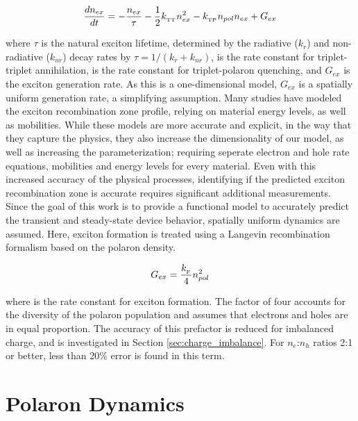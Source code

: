 \documentclass[../thesis.tex]{subfiles}
\begin{document}
\begin{equation}
\frac{dn_{ex}}{dt} = - \frac{n_{ex}}{\tau}-\frac{1}{2}k_{_\text{\tiny TT}} n_{ex}^2-k_{_\text{\tiny TP}} n_{pol}n_{ex}+G_{ex}
\label{eqn:exciton_rate}
\end{equation}

where $\tau$ is the natural exciton lifetime, determined by the radiative ($k_r$) and non-radiative ($k_{nr}$) decay rates by $\tau=1/(k_r+k_{nr})$, \ktt is the rate constant for triplet-triplet annihilation, \ktp is the rate constant for triplet-polaron quenching, and $G_{ex}$ is the exciton generation rate.  
As this is a one-dimensional model, $G_{ex}$ is a spatially uniform generation rate, a simplifying assumption.
Many studies have modeled the exciton recombination zone profile, relying on material energy levels, as well as mobilities.\cite{Rihani2006,Hassine2001,Hassine2002,Ruhstaller2003,Ruhstaller2001}
While these models are more accurate and explicit, in the way that they capture the physics, they also increase the dimensionality of our model, as well as increasing the parameterization; requiring seperate electron and hole rate equations, mobilities and energy levels for every material.
Even with this increased accuracy of the physical processes, identifying if the predicted exciton recombination zone is accurate requires significant additional measurements.
Since the goal of this work is to provide a functional model to accurately predict the transient and steady-state device behavior, spatially uniform dynamics are assumed.
Here, exciton formation is treated using a Langevin recombination formalism based on the polaron density.\cite{Ruhstaller2003,Pinner1999,Blom1996}

\begin{equation}
G_{ex}=\frac{k_{_\text{\tiny F}}}{4}n_{pol}^2
\label{eqn:exciton_formation}
\end{equation}

where \kf is the rate constant for exciton formation.  The factor of four accounts for the diversity of the polaron population and assumes that electrons and holes are in equal proportion.  
The accuracy of this prefactor is reduced for imbalanced charge, and is investigated in Section \ref{sec:charge_imbalance}.
For $n_e$:$n_h$ ratios 2:1 or better, less than 20\% error is found in this term.  

\section{Polaron Dynamics}
\end{document}
